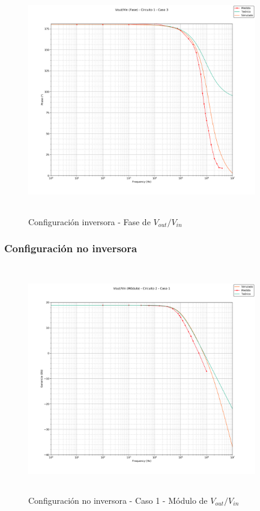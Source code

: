 \begin{figure}[H] %
	\centering
	\includegraphics[width=10cm,height=10cm,keepaspectratio]{../EJ1/00GRAFICOS/c1c3/c1c3voviFASE.png}
	\caption{Configuración inversora - Fase de $V_{out}/V_{in}$}
	\label{c1c3voviP}
\end{figure}

\subsubsection*{Configuraci\'on no inversora}

\begin{figure}[H] %
	\centering
	\includegraphics[width=10cm,height=10cm,keepaspectratio]{../EJ1/00GRAFICOS/c2c1/c2c1voviMod.png}
	\caption{Configuración no inversora - Caso 1 -  M\'odulo de $V_{out}/V_{in}$}
	\label{c2c1voviM}
\end{figure}

